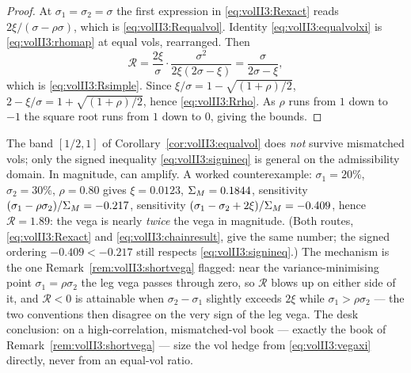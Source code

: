 \begin{proof}
At $\sigma_1 = \sigma_2 = \sigma$ the first expression in
\eqref{eq:volII3:Rexact} reads $2\xi/(\sigma - \rho\sigma)$, which is
\eqref{eq:volII3:Requalvol}. Identity \eqref{eq:volII3:equalvolxi} is
\eqref{eq:volII3:rhomap} at equal vols, rearranged. Then
\begin{equation}\label{eq:volII3:Rstep}
\mathcal{R} = \frac{2\xi}{\sigma}\cdot\frac{\sigma^2}{2\xi(2\sigma - \xi)}
= \frac{\sigma}{2\sigma - \xi},
\end{equation}
which is \eqref{eq:volII3:Rsimple}. Since $\xi/\sigma = 1 - \sqrt{(1+\rho)/2}$,
$2 - \xi/\sigma = 1 + \sqrt{(1+\rho)/2}$, hence
\eqref{eq:volII3:Rrho}. As $\rho$ runs from $1$ down to $-1$ the square root
runs from $1$ down to $0$, giving the bounds.
\end{proof}

\begin{remark}
\label{rem:volII3:Rwarn}
The band $[1/2, 1]$ of Corollary~\ref{cor:volII3:equalvol} does \emph{not}
survive mismatched vols; only the signed inequality \eqref{eq:volII3:signineq}
is general on the admissibility domain. In magnitude, \stickycvc{} can
amplify. A worked counterexample: $\sigma_1 = 20\%$, $\sigma_2 = 30\%$,
$\rho = 0.80$ gives $\xi = 0.0123$, $\Sigma_M = 0.1844$, \stickyrho{}
sensitivity $(\sigma_1 - \rho\sigma_2)/\Sigma_M = -0.217$, \stickycvc{}
sensitivity $(\sigma_1 - \sigma_2 + 2\xi)/\Sigma_M = -0.409$, hence
$\mathcal{R} = 1.89$: the \stickycvc{} vega is nearly \emph{twice} the
\stickyrho{} vega in magnitude. (Both routes,
\eqref{eq:volII3:Rexact} and \eqref{eq:volII3:chainresult}, give the same
number; the signed ordering $-0.409 < -0.217$ still respects
\eqref{eq:volII3:signineq}.) The mechanism is the one
Remark~\ref{rem:volII3:shortvega} flagged: near the variance-minimising point
$\sigma_1 = \rho\sigma_2$ the \stickyrho{} leg vega passes through zero, so
$\mathcal{R}$ blows up on either side of it, and $\mathcal{R} < 0$ is
attainable when $\sigma_2 - \sigma_1$ slightly exceeds $2\xi$ while $\sigma_1
> \rho\sigma_2$ --- the two conventions then disagree on the very sign of the
leg vega. The desk conclusion: on a high-correlation, mismatched-vol book ---
exactly the book of Remark~\ref{rem:volII3:shortvega} --- size the vol hedge
from \eqref{eq:volII3:vegaxi} directly, never from an equal-vol ratio.
\end{remark}

